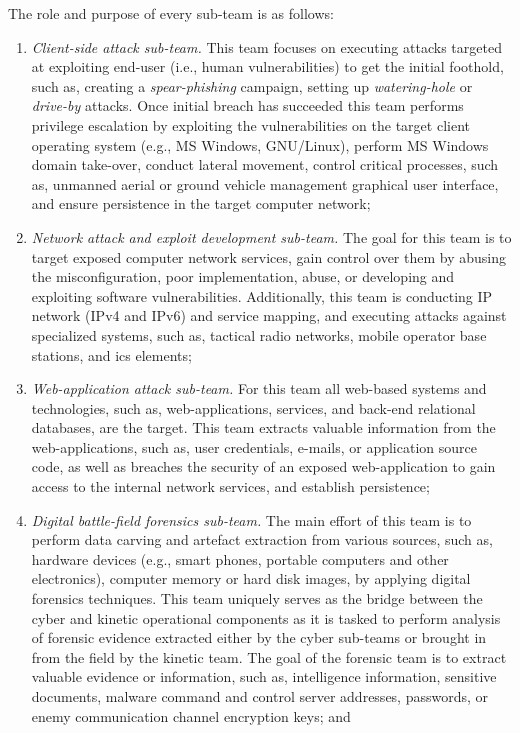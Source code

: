 \begin{enumerate}
\begin{enumerate}
        The role and purpose of every sub-team is as follows:
        \begin{enumerate}
            \item \textit{Client-side attack sub-team.} This team focuses on executing attacks targeted at exploiting end-user (i.e., human vulnerabilities) to get the initial foothold, such as, creating a \textit{spear-phishing} campaign, setting up \textit{watering-hole} or \textit{drive-by} attacks. Once initial breach has succeeded this team performs privilege escalation by exploiting the vulnerabilities on the target client operating system (e.g., MS Windows, GNU/Linux), perform MS Windows domain take-over, conduct lateral movement, control critical processes, such as, unmanned aerial or ground vehicle management graphical user interface, and ensure persistence in the target computer network;
            \item \textit{Network attack and exploit development sub-team.} The goal for this team is to target exposed computer network services, gain control over them by abusing the misconfiguration, poor implementation, abuse, or developing and exploiting software vulnerabilities. Additionally, this team is conducting IP network (IPv4 and IPv6) and service mapping, and executing attacks against specialized systems, such as, tactical radio networks, mobile operator base stations, and \gls{ics} elements;
            \item \textit{Web-application attack sub-team.} For this team all web-based systems and technologies, such as, web-applications, services, and back-end relational databases, are the target. This team extracts valuable information from the web-applications, such as, user credentials, e-mails, or application source code, as well as breaches the security of an exposed web-application to gain access to the internal network services, and establish persistence;
            \item \textit{Digital battle-field forensics sub-team.} The main effort of this team is to perform data carving and artefact extraction from various sources, such as, hardware devices (e.g., smart phones, portable computers and other electronics), computer memory or hard disk images, by applying digital forensics techniques. This team uniquely serves as the bridge between the cyber and kinetic operational components as it is tasked to perform analysis of forensic evidence extracted either by the cyber sub-teams or brought in from the field by the kinetic team. The goal of the forensic team is to extract valuable evidence or information, such as, intelligence information, sensitive documents, malware command and control server addresses, passwords, or enemy communication channel encryption keys; and

\end{enumerate}
\end{enumerate}
\end{enumerate}
